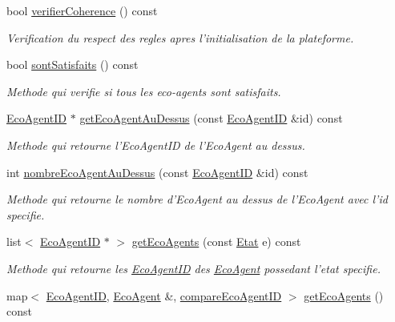 \begin{CompactItemize}
bool \hyperlink{classPlateformeEcoResolution_0d35ee702a0b255f0da91aa382089865}{verifierCoherence} () const 
\begin{CompactList}\small\item\em Verification du respect des regles apres l'initialisation de la plateforme. \item\end{CompactList}\item 
bool \hyperlink{classPlateformeEcoResolution_673b4d17360ab1ff1e7c7f28a1b2e35e}{sontSatisfaits} () const 
\begin{CompactList}\small\item\em Methode qui verifie si tous les eco-agents sont satisfaits. \item\end{CompactList}\item 
\hyperlink{classEcoAgentID}{EcoAgentID} $\ast$ \hyperlink{classPlateformeEcoResolution_a33074c437f57bf9f409502de82b2f58}{getEcoAgentAuDessus} (const \hyperlink{classEcoAgentID}{EcoAgentID} \&id) const 
\begin{CompactList}\small\item\em Methode qui retourne l'EcoAgentID de l'EcoAgent au dessus. \item\end{CompactList}\item 
int \hyperlink{classPlateformeEcoResolution_bccb426d9f1113e66b652bb63e7fafcd}{nombreEcoAgentAuDessus} (const \hyperlink{classEcoAgentID}{EcoAgentID} \&id) const 
\begin{CompactList}\small\item\em Methode qui retourne le nombre d'EcoAgent au dessus de l'EcoAgent avec l'id specifie. \item\end{CompactList}\item 
list$<$ \hyperlink{classEcoAgentID}{EcoAgentID} $\ast$ $>$ \hyperlink{classPlateformeEcoResolution_eccbbf85153147e551b9b6fa65f554e2}{getEcoAgents} (const \hyperlink{etat_8hpp_767b7a63d7677f92d697621b4166af1b}{Etat} e) const 
\begin{CompactList}\small\item\em Methode qui retourne les \hyperlink{classEcoAgentID}{EcoAgentID} des \hyperlink{classEcoAgent}{EcoAgent} possedant l'etat specifie. \item\end{CompactList}\item 
map$<$ \hyperlink{classEcoAgentID}{EcoAgentID}, \hyperlink{classEcoAgent}{EcoAgent} \&, \hyperlink{structcompareEcoAgentID}{compareEcoAgentID} $>$ \hyperlink{classPlateformeEcoResolution_c3c3307a04fbe2d33c753c2b0eef79af}{getEcoAgents} () const 

\end{CompactItemize}
